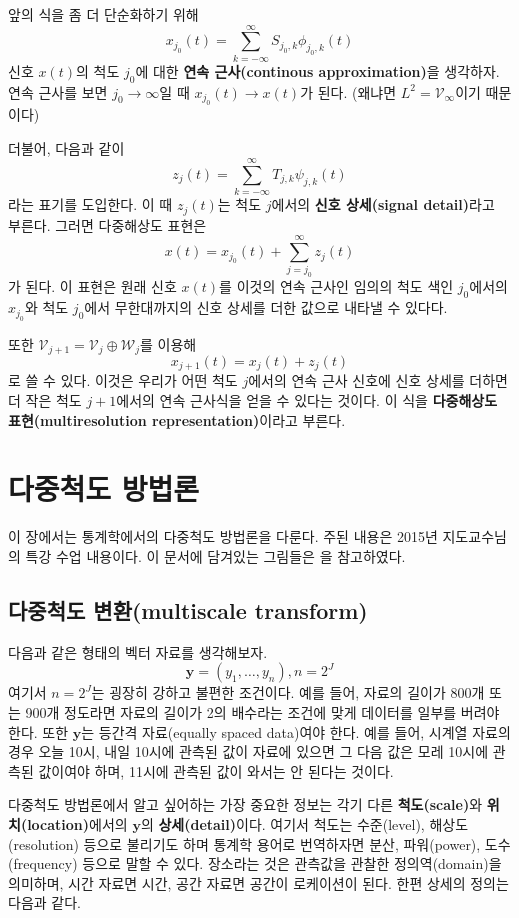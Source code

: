 \documentclass[b5paper,]{scrbook}
\theoremstyle{plain}
\theoremstyle{definition}
\numberwithin{equation}{section}
\begin{document}
앞의 식을 좀 더 단순화하기 위해
\[x_{j_{0}}(t)=\sum_{k=-\infty}^{\infty}S_{j_{0},k}\phi_{j_{0},k}(t)\]
신호 \(x(t)\)의 척도 \(j_{0}\)에 대한 \textbf{연속 근사(continous
approximation)}을 생각하자. 연속 근사를 보면
\(j_{0}\rightarrow \infty\)일 때 \(x_{j_{0}}(t)\rightarrow x(t)\)가
된다. (왜냐면 \(L^{2}=\mathcal{V}_{\infty}\)이기 때문이다)

더불어, 다음과 같이
\[z_{j}(t)=\sum_{k=-\infty}^{\infty}T_{j,k}\psi_{j,k}(t)\] 라는 표기를
도입한다. 이 때 \(z_{j}(t)\)는 척도 \(j\)에서의 \textbf{신호 상세(signal
detail)}라고 부른다. 그러면 다중해상도 표현은
\[x(t)=x_{j_{0}}(t)+\sum_{j=j_{0}}^{\infty}z_{j}(t)\] 가 된다. 이 표현은
원래 신호 \(x(t)\)를 이것의 연속 근사인 임의의 척도 색인 \(j_{0}\)에서의
\(x_{j_{0}}\)와 척도 \(j_{0}\)에서 무한대까지의 신호 상세를 더한 값으로
내타낼 수 있다다.

또한 \(\mathcal{V}_{j+1}=\mathcal{V}_{j}\oplus\mathcal{W}_{j}\)를 이용해
\[x_{j+1}(t)=x_{j}(t)+z_{j}(t)\] 로 쓸 수 있다. 이것은 우리가 어떤 척도
\(j\)에서의 연속 근사 신호에 신호 상세를 더하면 더 작은 척도
\(j+1\)에서의 연속 근사식을 얻을 수 있다는 것이다. 이 식을
\textbf{다중해상도 표현(multiresolution representation)}이라고 부른다.

\chapter{다중척도 방법론}\label{multiscale}

이 장에서는 통계학에서의 다중척도 방법론을 다룬다. 주된 내용은 2015년
지도교수님의 특강 수업 내용이다. 이 문서에 담겨있는 그림들은
\citep{Nason2010}을 참고하였다.

\section{다중척도 변환(multiscale
transform)}\label{-multiscale-transform}

다음과 같은 형태의 벡터 자료를 생각해보자.
\[ \mathbf{y}=(y_{1},\ldots,y_{n}), n=2^{J}\] 여기서 \(n=2^{J}\)는
굉장히 강하고 불편한 조건이다. 예를 들어, 자료의 길이가 800개 또는 900개
정도라면 자료의 길이가 2의 배수라는 조건에 맞게 데이터를 일부를 버려야
한다. 또한 \(\mathbf{y}\)는 등간격 자료(equally spaced data)여야 한다.
예를 들어, 시계열 자료의 경우 오늘 10시, 내일 10시에 관측된 값이 자료에
있으면 그 다음 값은 모레 10시에 관측된 값이여야 하며, 11시에 관측된 값이
와서는 안 된다는 것이다.

다중척도 방법론에서 알고 싶어하는 가장 중요한 정보는 각기 다른
\textbf{척도(scale)}와 \textbf{위치(location)}에서의 \(\mathbf{y}\)의
\textbf{상세(detail)}이다. 여기서 척도는 수준(level), 해상도(resolution)
등으로 불리기도 하며 통계학 용어로 번역하자면 분산, 파워(power),
도수(frequency) 등으로 말할 수 있다. 장소라는 것은 관측값을 관찰한
정의역(domain)을 의미하며, 시간 자료면 시간, 공간 자료면 공간이
로케이션이 된다. 한편 상세의 정의는 다음과 같다.
\end{document}
